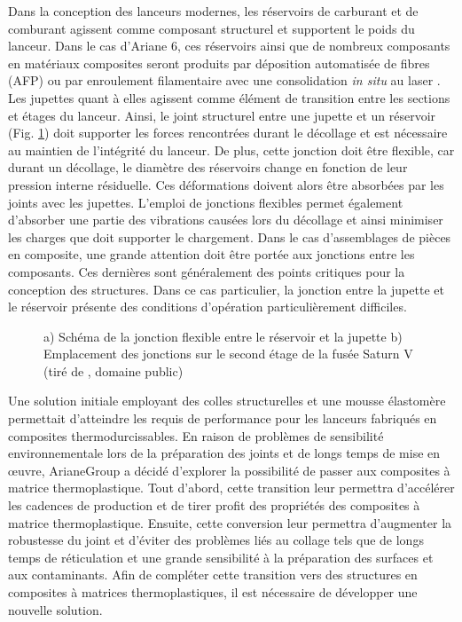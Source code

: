 Dans la conception des lanceurs modernes, les réservoirs de carburant et de comburant agissent comme composant structurel et supportent le poids du lanceur. 
Dans le cas d'Ariane 6, ces réservoirs ainsi que de nombreux composants en matériaux composites seront produits par déposition automatisée de fibres (AFP) ou par enroulement filamentaire avec une consolidation \textit{in situ} au laser \cite{Krzeminski2014}. 
Les jupettes quant à elles agissent comme élément de transition entre les sections et étages du lanceur. 
Ainsi, le joint structurel entre une jupette et un réservoir (Fig. \ref{fig:schema_jonction}) doit supporter les forces rencontrées durant le décollage et est nécessaire au maintien de l'intégrité du lanceur. 
De plus, cette jonction doit être flexible, car durant un décollage, le diamètre des réservoirs change en fonction de leur pression interne résiduelle. 
Ces déformations doivent alors être absorbées par les joints avec les jupettes. 
L'emploi de jonctions flexibles permet également d'absorber une partie des vibrations causées lors du décollage et ainsi minimiser les charges que doit supporter le chargement. 
Dans le cas d'assemblages de pièces en composite, une grande attention doit être portée aux jonctions entre les composants. 
Ces dernières sont généralement des points critiques pour la conception des structures. 
Dans ce cas particulier, la jonction entre la jupette et le réservoir présente des conditions d'opération particulièrement difficiles. 

\begin{figure}[h]
	\centering
	
	\caption{a) Schéma de la jonction flexible entre le réservoir et la jupette b) Emplacement des jonctions sur le second étage de la fusée Saturn V (tiré de \cite{OfficeofMannedSpaceFligt1968}, domaine public) }
	\label{fig:schema_jonction}
\end{figure}

Une solution initiale employant des colles structurelles et une mousse élastomère permettait d'atteindre les requis de performance pour les lanceurs fabriqués en composites thermodurcissables. 
En raison de problèmes de sensibilité environnementale lors de la préparation des joints et de longs temps de mise en œuvre, ArianeGroup a décidé d'explorer la possibilité de passer aux composites à matrice thermoplastique. 
Tout d'abord, cette transition leur permettra d'accélérer les cadences de production et de tirer profit des propriétés des composites à matrice thermoplastique. 
Ensuite, cette conversion leur permettra d'augmenter la robustesse du joint et d'éviter des problèmes liés au collage tels que de longs temps de réticulation et une grande sensibilité à la préparation des surfaces et aux contaminants. 
Afin de compléter cette transition vers des structures en composites à matrices thermoplastiques, il est nécessaire de développer une nouvelle solution. 

